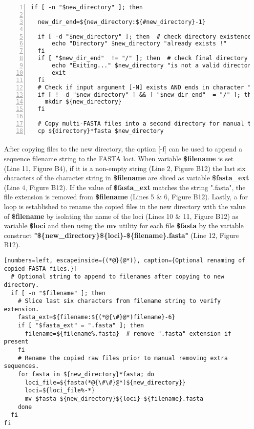 \begin{lstlisting}[numbers=left, showstringspaces=false, escapechar=\%, caption={Establish a new directory and copy FASTA files for manual edits.}]
if [ -n "$new_directory" ]; then

  new_dir_end=${new_directory:${#new_directory}-1}
  
  if [ -d "$new_directory" ]; then  # check directory existence
      echo "Directory" $new_directory "already exists !" 
  fi
  if [ "$new_dir_end"  != "/" ]; then  # check final directory character
      echo "Exiting..." $new_directory "is not a valid directory name."; 
      exit
  fi
  # Check if input argument [-N] exists AND ends in character "/".
  if [ ! -d "$new_directory" ] && [ "$new_dir_end"  = "/" ]; then 
    mkdir ${new_directory}
  fi
  
  # Copy multi-FASTA files into a second directory for manual trimming.
  cp ${directory}*fasta $new_directory
\end{lstlisting}

\vspace*{36pt}

\paragraph{} After copying files to the new directory, the option [-f] can be used to append a sequence filename string to the FASTA loci.  When variable \textbf{\$filename} is set (Line 11, Figure B4), if it is a non-empty string (Line 2, Figure B12) the last six characters of the character string in \textbf{\$filename} are sliced as variable \textbf{\$fasta\_ext} (Line 4, Figure B12).  If the value of \textbf{\$fasta\_ext} matches the string ".fasta", the file extension is removed from \textbf{\$filename} (Lines 5 \& 6, Figure B12).  Lastly, a for loop is established to rename the copied files in the new directory with the value of \textbf{\$filename} by isolating the name of the loci (Lines 10 \& 11, Figure B12) as variable \textbf{\$loci} and then using the \textbf{mv} utility for each file \textbf{\$fasta} by the variable construct \textbf{\mbox{"\$\{new\_directory\}\$\{loci\}-\$\{filename\}.fasta"}} (Line 12, Figure B12).  

\vspace*{36pt}

\begin{lstlisting}[numbers=left, escapeinside={(*@}{@*)}, caption={Optional renaming of copied FASTA files.}]
  # Optional string to append to filenames after copying to new directory.
  if [ -n "$filename" ]; then
    # Slice last six characters from filename string to verify extension.
    fasta_ext=${filename:${(*@{\#}@*)filename}-6}  
    if [ "$fasta_ext" = ".fasta" ]; then
      filename=${filename%.fasta}  # remove ".fasta" extension if present
    fi
    # Rename the copied raw files prior to manual removing extra sequences.
    for fasta in ${new_directory}*fasta; do
      loci_file=${fasta(*@{\#\#}@*)${new_directory}}
      loci=${loci_file%-*}
      mv $fasta ${new_directory}${loci}-${filename}.fasta
    done
  fi
fi
\end{lstlisting}

